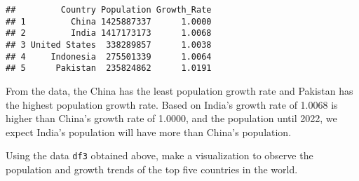 \documentclass[
]{article}
\begin{document}
\begin{verbatim}
##         Country Population Growth_Rate
## 1         China 1425887337      1.0000
## 2         India 1417173173      1.0068
## 3 United States  338289857      1.0038
## 4     Indonesia  275501339      1.0064
## 5      Pakistan  235824862      1.0191
\end{verbatim}

From the data, the China has the least population growth rate and
Pakistan has the highest population growth rate. Based on India's growth
rate of 1.0068 is higher than China's growth rate of 1.0000, and the
population until 2022, we expect India's population will have more than
China's population.

Using the data \texttt{df3} obtained above, make a visualization to
observe the population and growth trends of the top five countries in
the world.
\end{document}

